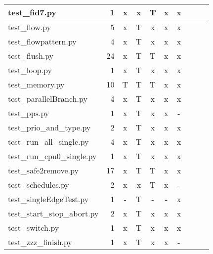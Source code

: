 \documentclass[12pt,a4paper]{report}
\begin{document}
\begin{table}
\begin{tabular}[t]{|l|r|c|c|c|c|c|c|c|c|}
test\_fid7.py                 &  1                  &   x        &   x             &   T           &   x              &   x                 \\ \hline
test\_flow.py                 &  5                  &   x        &   T             &   x           &   x              &   x                 \\ \hline
test\_flowpattern.py          &  4                  &   x        &   T             &   x           &   x              &   x                 \\ \hline
test\_flush.py                &  24                 &   x        &   T             &   T           &   x              &   x                 \\ \hline
test\_loop.py                 &  1                  &   x        &   T             &   x           &   x              &   x                 \\ \hline
test\_memory.py               &  10                 &   T        &   T             &   T           &   x              &   x                 \\ \hline
test\_parallelBranch.py       &  4                  &   x        &   T             &   x           &   x              &   x                 \\ \hline
test\_pps.py                  &  1                  &   x        &   T             &   x           &   x              &   -                 \\ \hline
test\_prio\_and\_type.py      &  2                  &   x        &   T             &   x           &   x              &   x                 \\ \hline
test\_run\_all\_single.py     &  4                  &   x        &   T             &   x           &   x              &   x                 \\ \hline
test\_run\_cpu0\_single.py    &  1                  &   x        &   T             &   x           &   x              &   x                 \\ \hline
test\_safe2remove.py          &  17                 &   x        &   T             &   T           &   x              &   x                 \\ \hline
test\_schedules.py            &  2                  &   x        &   x             &   T           &   x              &   -                 \\ \hline
test\_singleEdgeTest.py       &  1                  &   -        &   T             &   -           &   -              &   x                 \\ \hline
test\_start\_stop\_abort.py   &  2                  &   x        &   T             &   x           &   x              &   x                 \\ \hline
test\_switch.py               &  1                  &   x        &   T             &   x           &   x              &   x                 \\ \hline
test\_zzz\_finish.py          &  1                  &   x        &   T             &   x           &   x              &   -                 \\ \hline
\end{tabular}


\end{table}
\end{document}

